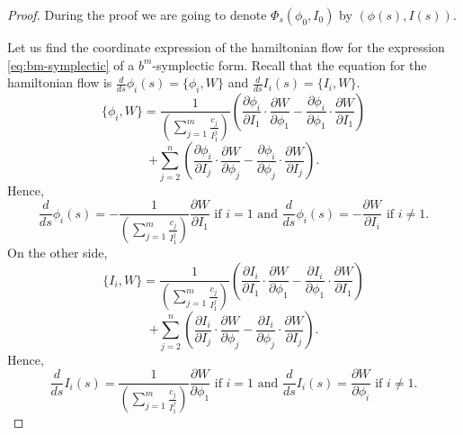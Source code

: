 \begin{proof}

During the proof we are going to denote $\Phi_s(\phi_0,I_0)$ by $(\phi(s),I(s))$.



Let us find the coordinate expression of the hamiltonian flow for the expression \ref{eq:bm-symplectic} of a $b^m$-symplectic form. Recall that the equation for the hamiltonian flow is $\frac{d}{ds}\phi_i(s)=\{\phi_i,W\}$ and $\frac{d}{ds}I_i(s)=\{I_i,W\}$.
$$\{\phi_i,W\} = \frac{1}{\left(\sum_{j=1}^m \frac{c_j}{I_1^j}\right)}\left(\frac{\partial \phi_i}{\partial I_1}\cdot\frac{\partial W}{\partial \phi_1} - \frac{\partial \phi_i}{\partial \phi_1}\cdot\frac{\partial W}{\partial I_1}\right)$$ 
$$+ \sum_{j=2}^n\left(\frac{\partial \phi_i}{\partial I_j}\cdot\frac{\partial W}{\partial \phi_j} - \frac{\partial \phi_i}{\partial \phi_j}\cdot\frac{\partial W}{\partial I_j}\right).$$
Hence,
$$
\displaystyle \frac{d}{ds}\phi_i(s) = -\frac{1}{\left(\sum_{j=1}^m \frac{c_j}{I_1^j}\right)}\frac{ \partial W}{\partial I_1} \text{ if } i = 1 \text{ and }
\displaystyle \frac{d}{ds}\phi_i(s) = -\frac{ \partial W}{\partial I_i} \text{ if } i \neq 1.
$$
On the other side,
$$\{I_i,W\} = \frac{1}{\left(\sum_{j=1}^m \frac{c_j}{I_1^j}\right)}\left(\frac{\partial I_i}{\partial I_1}\cdot\frac{\partial W}{\partial \phi_1} - \frac{\partial I_i}{\partial \phi_1}\cdot\frac{\partial W}{\partial I_1}\right) $$
$$+ \sum_{j=2}^n\left(\frac{\partial I_i}{\partial I_j}\cdot\frac{\partial W}{\partial \phi_j} - \frac{\partial I_i}{\partial \phi_j}\cdot\frac{\partial W}{\partial I_j}\right).$$
Hence,
$$
\frac{d}{ds}I_i(s) = \frac{1}{\left(\sum_{j=1}^m \frac{c_j}{I_1^j}\right)}\frac{ \partial W}{\partial \phi_1} \text{ if } i = 1 \text{ and } \frac{d}{ds}I_i(s) = \frac{ \partial W}{\partial \phi_i} \text{ if } i \neq 1.
$$


\end{proof}
